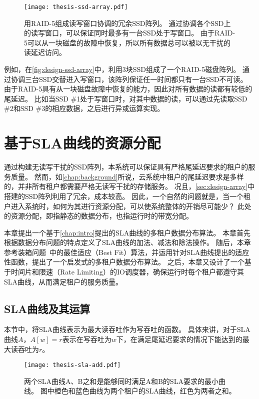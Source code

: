 \begin{figure}[h]
  \centering
  \texttt{[image: thesis-ssd-array.pdf]}
  \caption{
        用RAID-5组成读写窗口协调的冗余SSD阵列。
        通过协调各个SSD上的读写窗口，可以保证同时最多有一台SSD处于写窗口。
        由于RAID-5可以从一块磁盘的故障中恢复，所以所有数据总可以被以无干扰的读延迟访问。
      }
  \label{fig:design-ssd-array}
\end{figure}

例如，在\autoref{fig:design-ssd-array}中，利用3块SSD组成了一个RAID-5磁盘阵列。
通过协调三台SSD交替进入写窗口，该阵列保证任一时间都只有一台SSD不可读。
由于RAID-5具有从一块磁盘故障中恢复的能力，因此对所有数据的读都有较低的尾延迟。
比如当SSD \#1处于写窗口时，对其中数据的读，可以通过先读取SSD \#2和SSD \#3的相应数据，之后进行异或运算实现。

\section{基于SLA曲线的资源分配}
\label{sec:design-allocation}

通过构建无读写干扰的SSD阵列，本系统可以保证具有严格尾延迟要求的租户的服务质量。
然而，如\autoref{chap:background}所说，云系统中租户的尾延迟要求是多样的，并非所有租户都需要严格无读写干扰的存储服务。
况且，\autoref{sec:design-array}中搭建的SSD阵列利用了冗余，成本较高。
因此，一个自然的问题就是，当一个租户进入系统时，如何为其进行资源分配，可以使系统整体的开销尽可能少？
此处的资源分配，即指静态的数据分布，也指运行时的带宽分配。

本章提出一个基于\autoref{chap:intro}提出的SLA曲线的多租户数据分布算法。
本章首先根据数据分布问题的特点定义了SLA曲线的加法、减法和除法操作。
随后，本章参考装箱问题~\cite{wiki:Bin-packing}中的最佳适应（Best Fit）算法，并运用针对SLA曲线提出的适应性函数，提出了一个启发式的多租户数据分布算法。
之后，本章又设计了一个基于时间片和限速（Rate Limiting）的IO调度器，确保运行时每个租户都遵守其SLA曲线，从而满足租户的服务质量。

\subsection{SLA曲线及其运算}
\label{sec:design-allocation-sla-arithmetic}

本节中，将SLA曲线表示为最大读吞吐作为写吞吐的函数。
具体来讲，对于SLA曲线$A$，$A[w] = r$表示在写吞吐为$w$下，在满足尾延迟要求的情况下能达到的最大读吞吐为$r$。

\begin{figure}[h]
  \centering
  \texttt{[image: thesis-sla-add.pdf]}
  \caption{
        两个SLA曲线A、B之和是能够同时满足A和B的SLA要求的最小曲线。
        图中橙色和蓝色曲线为两个租户的SLA曲线，红色为两者之和。
      }
  \label{fig:design-sla-add}
\end{figure}

